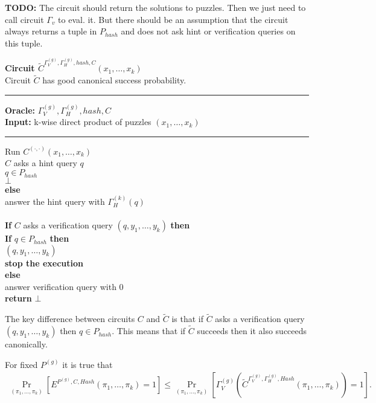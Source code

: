 \begin{todo}
  \textbf{TODO:} The circuit should return the solutions to puzzles. Then we just need to call circuit $ \Gamma_v $ to eval. it.
  But there should be an assumption that the circuit always returns a tuple in $P_{hash}$ and does not ask hint or verification queries
  on this tuple.
\end{todo}

\begin{codeblock}
  \textbf{Circuit $\widetilde{C}^{\Gamma_V^{(g)}, \Gamma_H^{(g)}, hash, C} (x_1, \dots, x_k)$} \\
  Circuit $\widetilde{C}$ has good canonical success probability.
  \medskip

  \hrule

  \medskip

  \textbf{Oracle:} $\Gamma_V^{(g)}, \Gamma_H^{(g)}, hash, C$ \\
  \textbf{Input:} k-wise direct product of puzzles $(x_1, \dots, x_k)$

  \medskip\hrule\medskip
  Run $C^{(\cdot,\cdot)}(x_1, \dots, x_k)$ \\
  \IndI \If $C$ asks a hint query $q$ \then\\
  \IndII \If $q \in P_{hash}$ \then\\
  \IndIII \return $\bot$\\
  \IndII \textbf{else}\\
  \IndIII answer the hint query with $\Gamma_H^{(k)}(q)$\\
  \\
  \IndI \textbf{If} $C$ asks a verification query $(q, y_1, \dots, y_k)$ \textbf{then} \\
  \IndII \textbf{If} $q \in P_{hash}$ \textbf{then} \\
  \IndIII {} $(q, y_1, \dots, y_k)$ \\
  \IndIII \textbf{stop the execution} \\
  \IndII \textbf{else} \\
  \IndIII answer verification query with 0 \\
  \textbf{return} $\bot$
\end{codeblock}
The key difference between circuits $C$ and $\widetilde{C}$
is that if $\widetilde{C}$ asks a verification query $(q, y_1, \dots, y_k)$ then $q \in P_{hash}$.
This means that if $\widetilde{C}$ succeeds then it also succeeds canonically.

\begin{lemma}
  For fixed $P^{(g)}$ it is true that
  \begin{align*}
  \underset{(\pi_1, \dots, \pi_k)}{\Pr}[E^{P^{(g)}, C, Hash}(\pi_1, \dots, \pi_k) = 1] \leq \underset{(\pi_1, \dots, \pi_k)}{\Pr}[\Gamma_V^{(g)} (\widetilde{C}^{\Gamma_V^{(g)}, \Gamma_H^{(g)}, Hash}(\pi_1, \dots, \pi_k)) = 1].
  \end{align*}
\end{lemma}


